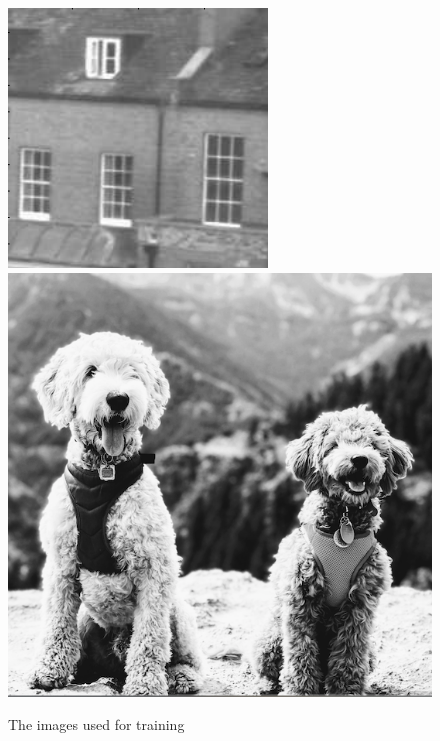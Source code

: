 \documentclass[11pt]{article}
\begin{document}
\begin{figure}[!htb]
\begin{center}
\begin{multicols}{4}
	\includegraphics[height = \linewidth]{house}\
	\includegraphics[height = \linewidth]{targetpractice}\par
\end{multicols}
\caption{The images used for training}
\end{center}
\end{figure}
\end{document}
